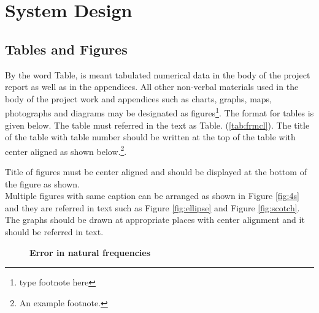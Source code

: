 \documentclass[BTech]{srmuthesis}
\begin{document}
\chapter{System Design}
\section{Tables and Figures} 
By the word Table, is meant tabulated numerical data in the body of the project report as well as in the appendices. All other non-verbal materials used in the body of the project work and appendices such as charts, graphs, maps, photographs and diagrams may be designated as figures\footnote{type footnote here}.
The format for tables  is given below. The table must referred in the text as Table. (\ref{tab:frmcl}). The title of the table with table number should be written at the top of the table with center aligned as shown below.\footnote{An example footnote.}.

Title of figures must be center aligned and should be displayed at the bottom of the figure as shown. \\

Multiple figures with same caption can be arranged as shown in Figure \ref{fig:4s} and they are referred in text such as Figure \ref{fig:ellipse} and Figure \ref{fig:scotch}. The graphs should be drawn at appropriate places with center alignment and it should be referred in text. \\
\begin{figure}[htpb]
\centering
{}
\caption{\bf Error in natural frequencies}
\label{fig:natfrq}
\end{figure}
\end{document}
